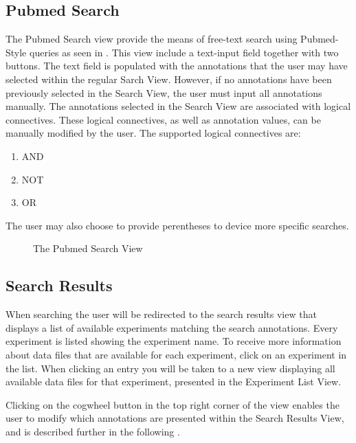\subsection{Pubmed Search}\label{sec:and_search_pub}
The Pubmed Search view provide the means of free-text search using Pubmed-Style queries as seen in . This view include a text-input field together with two buttons. The text field  is populated with the annotations that the user may have selected within the regular Sarch View. However, if no annotations have been previously selected in the Search View, the user must input all annotations manually. The annotations selected in the Search View are associated with logical connectives. These logical connectives, as well as annotation values, can be manually modified by the user. The supported logical connectives are: 

\begin{enumerate}
\item AND
\item NOT
\item OR
\end{enumerate}

The user may also choose to provide perentheses to device more specific searches.

\begin{figure}[h]
\caption{The Pubmed Search View}
\label{fig:and_pubmed_man} 
\end{figure}
\FloatBarrier


\subsection{Search Results}
When searching the user will be redirected to the search results view  that displays a list
of available experiments matching the search annotations. Every experiment is listed showing 
the experiment name. To receive more information about data files that are available for each experiment,
click on an experiment in the list. When clicking an entry you will be taken to a new view displaying all
available data files for that experiment, presented in the Experiment List View. 

Clicking on the cogwheel button in the top right corner of the view enables the user to modify which annotations are presented within the Search Results View, and is described further in the following .

